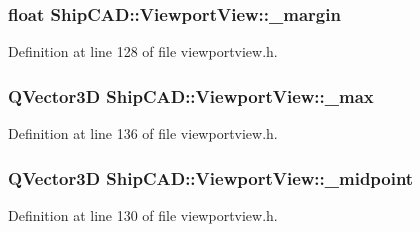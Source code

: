 \subsubsection[{\texorpdfstring{\+\_\+margin}{_margin}}]{\setlength{\rightskip}{0pt plus 5cm}float Ship\+C\+A\+D\+::\+Viewport\+View\+::\+\_\+margin\hspace{0.3cm}{\ttfamily [protected]}}\hypertarget{classShipCAD_1_1ViewportView_a4cce24be9f8367c04714cd5f091ad637}{}\label{classShipCAD_1_1ViewportView_a4cce24be9f8367c04714cd5f091ad637}


Definition at line 128 of file viewportview.\+h.

\subsubsection[{\texorpdfstring{\+\_\+max}{_max}}]{\setlength{\rightskip}{0pt plus 5cm}Q\+Vector3D Ship\+C\+A\+D\+::\+Viewport\+View\+::\+\_\+max\hspace{0.3cm}{\ttfamily [protected]}}\hypertarget{classShipCAD_1_1ViewportView_af523ce78903a7c9b9d1c2e5548d8a283}{}\label{classShipCAD_1_1ViewportView_af523ce78903a7c9b9d1c2e5548d8a283}


Definition at line 136 of file viewportview.\+h.

\subsubsection[{\texorpdfstring{\+\_\+midpoint}{_midpoint}}]{\setlength{\rightskip}{0pt plus 5cm}Q\+Vector3D Ship\+C\+A\+D\+::\+Viewport\+View\+::\+\_\+midpoint\hspace{0.3cm}{\ttfamily [protected]}}\hypertarget{classShipCAD_1_1ViewportView_af4017af3ac64751ce2c5f348d2567657}{}\label{classShipCAD_1_1ViewportView_af4017af3ac64751ce2c5f348d2567657}


Definition at line 130 of file viewportview.\+h.

